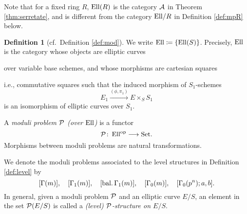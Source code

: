 \documentclass{gtpart}
\theoremstyle{definition}
\newtheorem{defn}[thm]{Definition}
\theoremstyle{remark}
\def\co{\colon\thinspace}
\newcommand{\Ell}{{\rm Ell}}
\newcommand{\CA}{{\cal A}}
\newcommand{\CP}{{\cal P}}
\newcommand{\Set}{{\rm Set}}
\newcommand{\op}{{\rm op}}
\newcommand{\G}{\Gamma}
\newcommand{\ce}{\coloneqq}
\numberwithin{equation}{section}
\numberwithin{thm}{section}
\begin{document}
Note that for a fixed ring $R$, $\Ell(R)$ is the category $\CA$ in 
Theorem \ref{thm:serretate}, and is different from the category $\Ell/R$ 
in Definition \ref{def:mpR} below.  

\begin{defn}[cf.~Definition \ref{def:mod}]
\label{def:mp}
 We write $\Ell \ce \{ \Ell(S) \}$.  Precisely, $\Ell$ is the category 
 whose objects are elliptic curves 
 \begin{center}
 \end{center}
 over variable base schemes, and whose morphisms are cartesian squares 
 \begin{center}
 \end{center}
 i.e., commutative squares such that the induced morphism of 
 $S_1$-schemes 
 \[
  E_1 \xrightarrow{(\phi,\pi_1)} E \times_S S_1 
 \]
 is an isomorphism of elliptic curves over $S_1$.  

 A {\em moduli problem $\CP$ (over $\Ell$)} is a functor 
 \[
  \CP \co \Ell^\op \longrightarrow \Set.  
 \]
 Morphisms between moduli problems are natural transformations.  
\end{defn}

We denote the moduli problems associated to the level structures in 
Definition \ref{def:level} by 
\begin{equation}
\label{five}
 [\G(m)], \quad [\G_1(m)], \quad [{\rm bal.} \thinspace \G_1(m)], 
 \quad [\G_0(m)], \quad [\G_0(p^n);a,b].  
\end{equation}
In general, given a moduli problem $\CP$ and an elliptic curve $E/S$, an 
element in the set $\CP(E/S)$ is called a {\em (level) $\CP$-structure 
on $E/S$}.  
\end{document}
